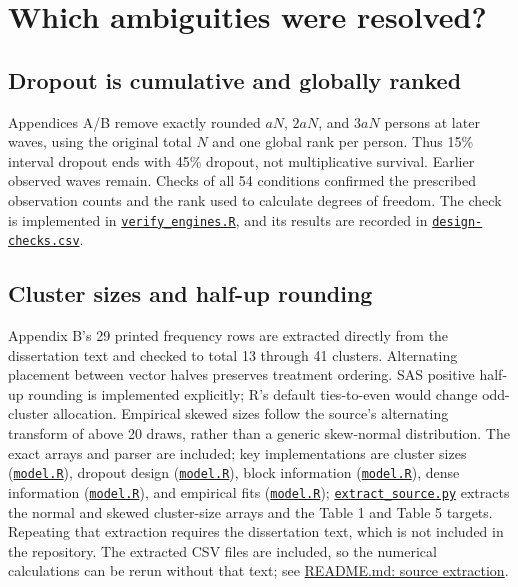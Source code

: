 \documentclass[11pt]{article}
\begin{document}
\section{Which ambiguities were resolved?}
\subsection{Dropout is cumulative and globally ranked}
Appendices A/B remove exactly rounded $aN$, $2aN$, and $3aN$ persons at later waves, using the original total $N$ and one global rank per person. Thus 15\% interval dropout ends with 45\% dropout, not multiplicative survival. Earlier observed waves remain. Checks of all 54 conditions confirmed the prescribed observation counts and the rank used to calculate degrees of freedom. The check is implemented in \href{https://github.com/alectionary/vibe-math/blob/master/formalization/kupzyk-power-assumptions/scripts/verify_engines.R}{\nolinkurl{verify_engines.R}}, and its results are recorded in \href{https://github.com/alectionary/vibe-math/blob/master/formalization/kupzyk-power-assumptions/outputs/design-checks.csv}{\nolinkurl{design-checks.csv}}.
\subsection{Cluster sizes and half-up rounding}
Appendix B's 29 printed frequency rows are extracted directly from the dissertation text and checked to total 13 through 41 clusters. Alternating placement between vector halves preserves treatment ordering. SAS positive half-up rounding is implemented explicitly; R's default ties-to-even would change odd-cluster allocation. Empirical skewed sizes follow the source's alternating transform of above 20 draws, rather than a generic skew-normal distribution. The exact arrays and parser are included; key implementations are cluster sizes (\href{https://github.com/alectionary/vibe-math/blob/master/formalization/kupzyk-power-assumptions/scripts/model.R#L6}{\nolinkurl{model.R}}), dropout design (\href{https://github.com/alectionary/vibe-math/blob/master/formalization/kupzyk-power-assumptions/scripts/model.R#L22}{\nolinkurl{model.R}}), block information (\href{https://github.com/alectionary/vibe-math/blob/master/formalization/kupzyk-power-assumptions/scripts/model.R#L31}{\nolinkurl{model.R}}), dense information (\href{https://github.com/alectionary/vibe-math/blob/master/formalization/kupzyk-power-assumptions/scripts/model.R#L39}{\nolinkurl{model.R}}), and empirical fits (\href{https://github.com/alectionary/vibe-math/blob/master/formalization/kupzyk-power-assumptions/scripts/model.R#L68}{\nolinkurl{model.R}}); \href{https://github.com/alectionary/vibe-math/blob/master/formalization/kupzyk-power-assumptions/scripts/extract_source.py}{\nolinkurl{extract_source.py}} extracts the normal and skewed cluster-size arrays and the Table 1 and Table 5 targets. Repeating that extraction requires the dissertation text, which is not included in the repository. The extracted CSV files are included, so the numerical calculations can be rerun without that text; see \href{https://github.com/alectionary/vibe-math/blob/master/formalization/kupzyk-power-assumptions/README.md#source-provenance-and-input-extraction}{README.md: source extraction}.
\end{document}
